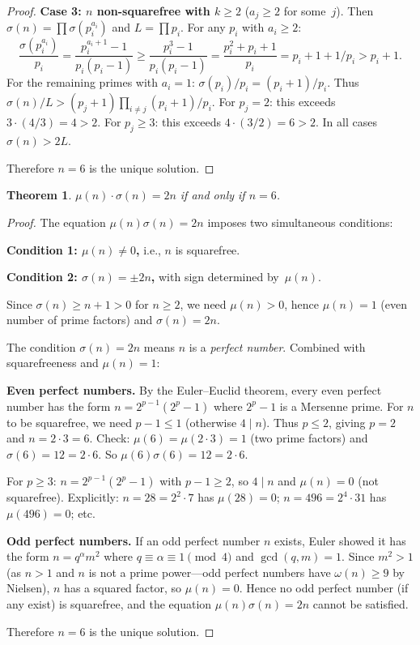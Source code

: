\documentclass[11pt]{amsart}
\newtheorem{theorem}{Theorem}
\theoremstyle{remark}
\begin{document}
\begin{proof}
\textbf{Case 3: $n$ non-squarefree with $k \geq 2$} ($a_j \geq 2$ for some~$j$).
Then $\sigma(n) = \prod \sigma(p_i^{a_i})$ and $L = \prod p_i$.
For any $p_i$ with $a_i \geq 2$:
\[
  \frac{\sigma(p_i^{a_i})}{p_i}
  = \frac{p_i^{a_i+1}-1}{p_i(p_i-1)}
  \geq \frac{p_i^3-1}{p_i(p_i-1)}
  = \frac{p_i^2+p_i+1}{p_i} = p_i + 1 + 1/p_i > p_i + 1.
\]
For the remaining primes with $a_i = 1$:
$\sigma(p_i)/p_i = (p_i+1)/p_i$.
Thus $\sigma(n)/L > (p_j + 1) \prod_{i \neq j} (p_i+1)/p_i$.
For $p_j = 2$: this exceeds $3 \cdot (4/3) = 4 > 2$.
For $p_j \geq 3$: this exceeds $4 \cdot (3/2) = 6 > 2$.
In all cases $\sigma(n) > 2L$.

Therefore $n = 6$ is the unique solution.
\end{proof}

\begin{theorem}\label{thm:mobius-sigma}
$\mu(n) \cdot \sigma(n) = 2n$ if and only if $n = 6$.
\end{theorem}

\begin{proof}
The equation $\mu(n) \sigma(n) = 2n$ imposes two simultaneous conditions:

\textbf{Condition 1: $\mu(n) \neq 0$,} i.e., $n$ is squarefree.

\textbf{Condition 2: $\sigma(n) = \pm 2n$,} with sign determined by~$\mu(n)$.

Since $\sigma(n) \geq n + 1 > 0$ for $n \geq 2$, we need $\mu(n) > 0$,
hence $\mu(n) = 1$ (even number of prime factors) and $\sigma(n) = 2n$.

The condition $\sigma(n) = 2n$ means $n$ is a \emph{perfect number}.
Combined with squarefreeness and $\mu(n) = 1$:

\textbf{Even perfect numbers.}
By the Euler--Euclid theorem, every even perfect number has the form
$n = 2^{p-1}(2^p - 1)$ where $2^p - 1$ is a Mersenne prime.
For $n$ to be squarefree, we need $p - 1 \leq 1$ (otherwise $4 \mid n$).
Thus $p \leq 2$, giving $p = 2$ and $n = 2 \cdot 3 = 6$.
Check: $\mu(6) = \mu(2 \cdot 3) = 1$ (two prime factors) and
$\sigma(6) = 12 = 2 \cdot 6$. So $\mu(6)\sigma(6) = 12 = 2 \cdot 6$. \checkmark

For $p \geq 3$: $n = 2^{p-1}(2^p-1)$ with $p - 1 \geq 2$,
so $4 \mid n$ and $\mu(n) = 0$ (not squarefree).
Explicitly: $n = 28 = 2^2 \cdot 7$ has $\mu(28) = 0$;
$n = 496 = 2^4 \cdot 31$ has $\mu(496) = 0$; etc.

\textbf{Odd perfect numbers.}
If an odd perfect number $n$ exists, Euler showed it has the form
$n = q^\alpha m^2$ where $q \equiv \alpha \equiv 1 \pmod{4}$
and $\gcd(q, m) = 1$.
Since $m^2 > 1$ (as $n > 1$ and $n$ is not a prime power---odd
perfect numbers have $\omega(n) \geq 9$ by Nielsen),
$n$ has a squared factor, so $\mu(n) = 0$.
Hence no odd perfect number (if any exist) is squarefree,
and the equation $\mu(n)\sigma(n) = 2n$ cannot be satisfied.

Therefore $n = 6$ is the unique solution.
\end{proof}
\end{document}
